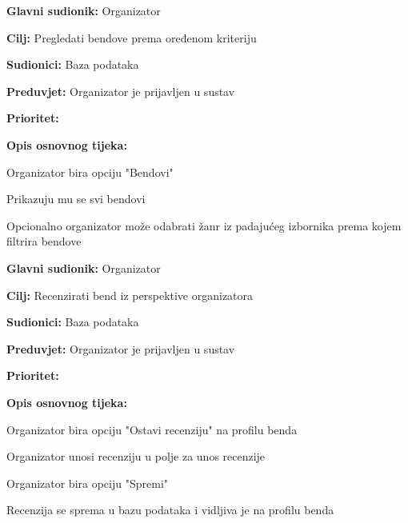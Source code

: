 \noindent {}
	\begin{packed_item}
		
		\item \textbf{Glavni sudionik: } Organizator
		\item \textbf{Cilj:} Pregledati bendove prema oređenom kriteriju
		\item \textbf{Sudionici:} Baza podataka
		\item \textbf{Preduvjet:} Organizator je prijavljen u sustav
		\item \textbf{Prioritet:} 
		\item \textbf{Opis osnovnog tijeka:} 
		
		\item[] \begin{packed_enum}
			
			\item Organizator bira opciju "Bendovi"
			\item Prikazuju mu se svi bendovi 
			\item Opcionalno organizator može odabrati žanr iz padajućeg izbornika prema kojem filtrira bendove
		\end{packed_enum}  
	
	\end{packed_item}


\noindent {}
	\begin{packed_item}
		
		\item \textbf{Glavni sudionik: } Organizator
		\item \textbf{Cilj:} Recenzirati bend iz perspektive organizatora
		\item \textbf{Sudionici:} Baza podataka
		\item \textbf{Preduvjet:} Organizator je prijavljen u sustav
		\item \textbf{Prioritet:} 
		\item \textbf{Opis osnovnog tijeka:} 
		
		\item[] \begin{packed_enum}
			
			\item Organizator bira opciju "Ostavi recenziju" na profilu benda
			\item Organizator unosi recenziju u polje za unos recenzije
			\item Organizator bira opciju "Spremi"
			\item Recenzija se sprema u bazu podataka i vidljiva je na profilu benda
		\end{packed_enum}  
	\end{packed_item}

